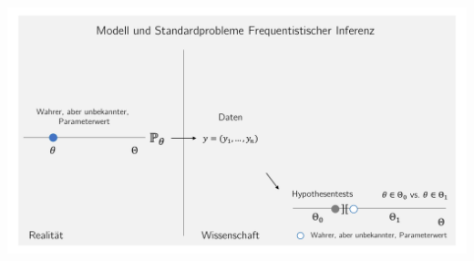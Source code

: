 \documentclass[
  8pt,
  ignorenonframetext,
]{beamer}
\begin{document}
\begin{frame}{}
\protect\hypertarget{section-3}{}
\begin{center}\includegraphics[width=1\linewidth]{12_Abbildungen/wtfi_12_frequentistische_inferenz_hypothesentests} \end{center}
\end{frame}
\end{document}
